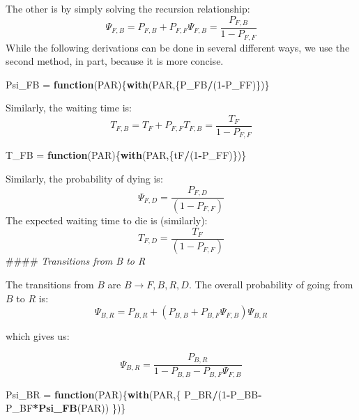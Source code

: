 \documentclass[]{article}
\newenvironment{Shaded}{\begin{snugshade}}{\end{snugshade}}
\newcommand{\ControlFlowTok}[1]{\textcolor[rgb]{0.13,0.29,0.53}{\textbf{#1}}}
\newcommand{\DecValTok}[1]{\textcolor[rgb]{0.00,0.00,0.81}{#1}}
\newcommand{\KeywordTok}[1]{\textcolor[rgb]{0.13,0.29,0.53}{\textbf{#1}}}
\newcommand{\NormalTok}[1]{#1}
\newcommand{\OperatorTok}[1]{\textcolor[rgb]{0.81,0.36,0.00}{\textbf{#1}}}
\newcommand{\StringTok}[1]{\textcolor[rgb]{0.31,0.60,0.02}{#1}}
\begin{document}
The other is by simply solving the recursion relationship:
\[\Psi_{F,B} = P_{F,B} + P_{F,F} \Psi_{F,B} = \frac{P_{F,B}}{1-P_{F,F}}\]
While the following derivations can be done in several different ways,
we use the second method, in part, because it is more concise.

\begin{Shaded}
\begin{Highlighting}[]
\NormalTok{Psi_FB =}\StringTok{ }\ControlFlowTok{function}\NormalTok{(PAR)\{}\KeywordTok{with}\NormalTok{(PAR,\{P_FB}\OperatorTok{/}\NormalTok{(}\DecValTok{1}\OperatorTok{-}\NormalTok{P_FF)\})\} }
\end{Highlighting}
\end{Shaded}

Similarly, the waiting time is:
\[T_{F,B} =  T_F + P_{F,F} T_{F,B} = \frac{T_F}{1-P_{F,F}}\]

\begin{Shaded}
\begin{Highlighting}[]
\NormalTok{T_FB =}\StringTok{ }\ControlFlowTok{function}\NormalTok{(PAR)\{}\KeywordTok{with}\NormalTok{(PAR,\{tF}\OperatorTok{/}\NormalTok{(}\DecValTok{1}\OperatorTok{-}\NormalTok{P_FF)\})\}}
\end{Highlighting}
\end{Shaded}

Similarly, the probability of dying is:
\[\Psi_{F,D} = \frac{P_{F,D}}{(1-P_{F,F})}\] The expected waiting time
to die is (similarly): \[T_{F,D} = \frac{T_F}{(1-P_{F,F})}\] \#\#\#\#
\emph{Transitions from B to R}

The transitions from \(B\) are \(B\rightarrow {F,B,R,D}\). The overall
probability of going from \(B\) to \(R\) is:
\[\Psi_{B,R} = P_{B,R} + \left(P_{B,B} + P_{B,F} \Psi_{F,B} \right) \Psi_{B,R}\]

which gives us:

\[ \Psi_{B,R} = \frac{P_{B,R}}{1-P_{B,B} - P_{B,F} \Psi_{F,B}} \]

\begin{Shaded}
\begin{Highlighting}[]
\NormalTok{Psi_BR =}\StringTok{ }\ControlFlowTok{function}\NormalTok{(PAR)\{}\KeywordTok{with}\NormalTok{(PAR,\{}
\NormalTok{  P_BR}\OperatorTok{/}\NormalTok{(}\DecValTok{1}\OperatorTok{-}\NormalTok{P_BB}\OperatorTok{-}\NormalTok{P_BF}\OperatorTok{*}\KeywordTok{Psi_FB}\NormalTok{(PAR))}
\NormalTok{\})\}}
\end{Highlighting}
\end{Shaded}
\end{document}
